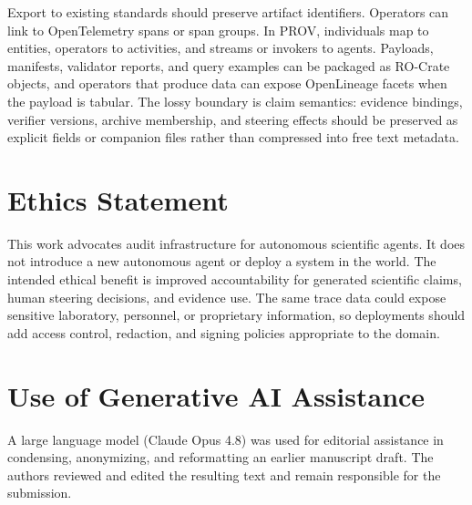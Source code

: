 \documentclass{article}
\begin{document}
Export to existing standards should preserve artifact identifiers. Operators can link to OpenTelemetry spans or span groups. In PROV, individuals map to entities, operators to activities, and streams or invokers to agents. Payloads, manifests, validator reports, and query examples can be packaged as RO-Crate objects, and operators that produce data can expose OpenLineage facets when the payload is tabular. The lossy boundary is claim semantics: evidence bindings, verifier versions, archive membership, and steering effects should be preserved as explicit fields or companion files rather than compressed into free text metadata.

\section*{Ethics Statement}
This work advocates audit infrastructure for autonomous scientific agents. It does not introduce a new autonomous agent or deploy a system in the world. The intended ethical benefit is improved accountability for generated scientific claims, human steering decisions, and evidence use. The same trace data could expose sensitive laboratory, personnel, or proprietary information, so deployments should add access control, redaction, and signing policies appropriate to the domain.

\section*{Use of Generative AI Assistance}
A large language model (Claude Opus 4.8) was used for editorial assistance in condensing, anonymizing, and reformatting an earlier manuscript draft. The authors reviewed and edited the resulting text and remain responsible for the submission.
\end{document}
